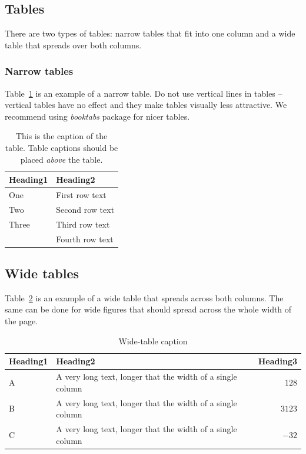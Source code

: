 \documentclass[10pt, a4paper]{article}
\begin{document}
\subsection{Tables}

There are two types of tables: narrow tables that fit into one column and a wide table that spreads over both columns.

\subsubsection{Narrow tables}

Table~\ref{tab:narrow-table} is an example of a narrow table. Do not use vertical lines in tables -- vertical tables have no effect and they make tables visually less attractive. We recommend using \textit{booktabs} package for nicer tables.

\begin{table}
\caption{This is the caption of the table. Table captions should be placed \textit{above} the table.}
\label{tab:narrow-table}
\begin{center}
\begin{tabular}{ll}
\toprule
Heading1 & Heading2 \\
\midrule
One & First row text \\
Two   & Second row text \\
Three   & Third row text \\
      & Fourth row text \\
\bottomrule
\end{tabular}
\end{center}
\end{table}

\subsection{Wide tables}

Table~\ref{tab:wide-table} is an example of a wide table that spreads across both columns. The same can be done for wide figures that should spread across the whole width of the page.

\begin{table}
\caption{Wide-table caption}
\label{tab:wide-table}
\begin{center}
\begin{tabular}{llr}
\toprule
Heading1 & Heading2 & Heading3\\
\midrule
A & A very long text, longer that the width of a single column & $128$\\
B & A very long text, longer that the width of a single column & $3123$\\
C & A very long text, longer that the width of a single column & $-32$\\
\bottomrule
\end{tabular}
\end{center}
\end{table}
\end{document}
